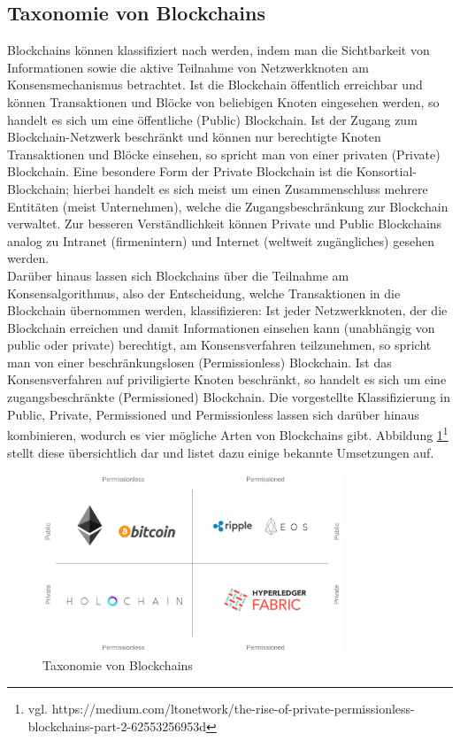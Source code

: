 \subsection{Taxonomie von Blockchains}
\label{subsec:fundamentals:dlt:taxonomy}
Blockchains können klassifiziert nach \cite{overview2017} werden, indem man die Sichtbarkeit von Informationen sowie die aktive Teilnahme von Netzwerkknoten am Konsensmechanismus betrachtet. Ist die Blockchain öffentlich erreichbar und können Transaktionen und Blöcke von beliebigen Knoten eingesehen werden, so handelt es sich um eine öffentliche (Public) Blockchain. Ist der Zugang zum Blockchain-Netzwerk beschränkt und können nur berechtigte Knoten Transaktionen und Blöcke einsehen, so spricht man von einer privaten (Private) Blockchain. Eine besondere Form der Private Blockchain ist die Konsortial-Blockchain; hierbei handelt es sich meist um einen Zusammenschluss mehrere Entitäten (meist Unternehmen), welche die Zugangsbeschränkung zur Blockchain verwaltet. Zur besseren Verständlichkeit können Private und Public Blockchains analog zu Intranet (firmenintern) und Internet (weltweit zugängliches) gesehen werden.\\
Darüber hinaus lassen sich Blockchains über die Teilnahme am Konsensalgorithmus, also der Entscheidung, welche Transaktionen in die Blockchain übernommen werden, klassifizieren: Ist jeder Netzwerkknoten, der die Blockchain erreichen und damit Informationen einsehen kann (unabhängig von public oder private) berechtigt, am Konsensverfahren teilzunehmen, so spricht man von einer beschränkungslosen (Permissionless) Blockchain. Ist das Konsensverfahren auf priviligierte Knoten beschränkt, so handelt es sich um eine zugangsbeschränkte (Permissioned) Blockchain. Die vorgestellte Klassifizierung in Public, Private, Permissioned und Permissionless lassen sich darüber hinaus kombinieren, wodurch es vier mögliche Arten von Blockchains gibt. Abbildung \ref{fig:chapter02:taxonomy}\footnote{vgl. https://medium.com/ltonetwork/the-rise-of-private-permissionless-blockchains-part-2-62553256953d} stellt diese übersichtlich dar und listet dazu einige bekannte Umsetzungen auf.

\begin{figure}[htbp]
 \centering
 \includegraphics[width=0.8\textwidth]{gfx/taxonomy.png}
 \caption{Taxonomie von Blockchains}
 \label{fig:chapter02:taxonomy}
\end{figure}

